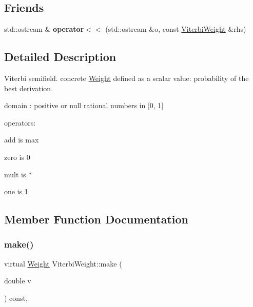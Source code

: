 \subsection*{Friends}
\begin{DoxyCompactItemize}
\item 
\mbox{\label{classViterbiWeight_a1eb660c8b3a3b745891ef0a04d41adad}} 
std\+::ostream \& {\bfseries operator$<$$<$} (std\+::ostream \&o, const \mbox{\hyperlink{classViterbiWeight}{Viterbi\+Weight}} \&rhs)
\end{DoxyCompactItemize}


\subsection{Detailed Description}
Viterbi semifield. concrete \mbox{\hyperlink{classWeight}{Weight}} defined as a scalar value\+: probability of the best derivation. 


\begin{DoxyItemize}
\item domain \+: positive or null rational numbers in \mbox{[}0, 1\mbox{]}
\item operators\+:
\item add is max
\item zero is 0
\item mult is $\ast$
\item one is 1 
\end{DoxyItemize}

\subsection{Member Function Documentation}
\mbox{\label{classViterbiWeight_a8b4676e41a4edb2cc5466d1e8cb1059a}} 
\subsubsection{\texorpdfstring{make()}{make()}}
{\footnotesize\ttfamily virtual \mbox{\hyperlink{classWeight}{Weight}} Viterbi\+Weight\+::make (\begin{DoxyParamCaption}\item[{double}]{v }\end{DoxyParamCaption}) const\hspace{0.3cm}{\ttfamily [inline]}, {\ttfamily [virtual]}}



